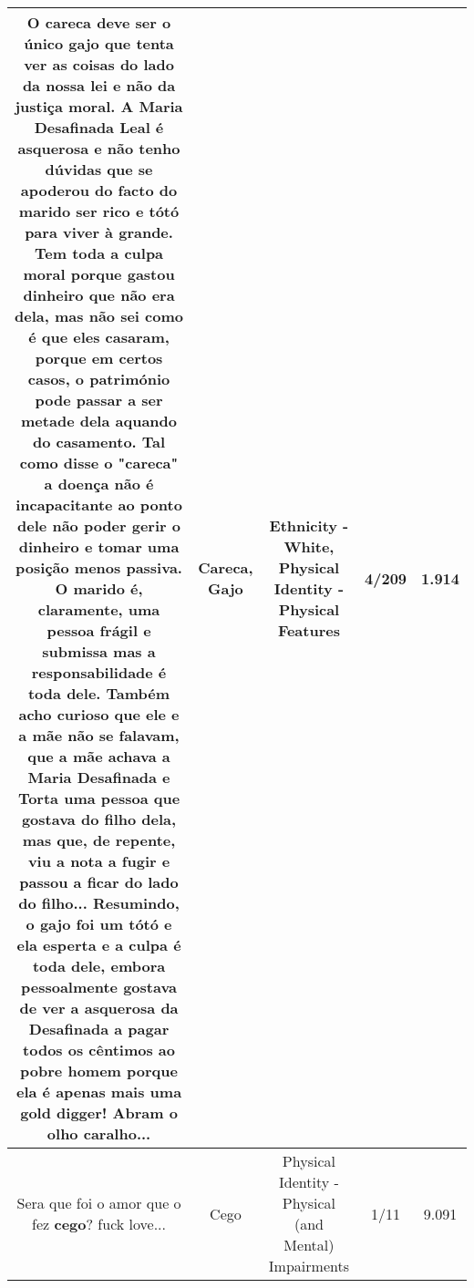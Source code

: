 \documentclass[11pt]{article}
\newlength\mylength
\begin{document}
\begin{center}
\begin{longtable}{|C{.65\mylength}|C{.30\mylength}|C{.12\mylength}|C{.12\mylength}|C{.12\mylength}|}
  \small O \textbf{careca} deve ser o único \textbf{gajo} que tenta ver as coisas do lado da nossa lei e não da justiça moral. A Maria Desafinada Leal é asquerosa e não tenho dúvidas que se apoderou do facto do marido ser rico e tótó para viver à grande. Tem toda a culpa moral porque gastou dinheiro que não era dela, mas não sei como é que eles casaram, porque em certos casos, o património pode passar a ser metade dela aquando do casamento. Tal como disse o "\textbf{careca}" a doença não é incapacitante ao ponto dele não poder gerir o dinheiro e tomar uma posição menos passiva. O marido é, claramente, uma pessoa frágil e submissa mas a responsabilidade é toda dele. Também acho curioso que ele e a mãe não se falavam, que a mãe achava a Maria Desafinada e Torta uma pessoa que gostava do filho dela, mas que, de repente, viu a nota a fugir e passou a ficar do lado do filho... Resumindo, o \textbf{gajo} foi um tótó e ela esperta e a culpa é toda dele, embora pessoalmente gostava de ver a asquerosa da Desafinada a pagar todos os cêntimos ao pobre homem porque ela é apenas mais uma gold digger! Abram o olho caralho...\normalsize   & Careca, Gajo & Ethnicity - White, Physical Identity - Physical Features & 4/209 & 1.914 \\  \hline
  \small Sera que foi o amor que o fez \textbf{cego}? fuck love...\normalsize   & Cego & Physical Identity - Physical (and Mental) Impairments & 1/11 & 9.091 \\  \hline
  
\end{longtable}
\end{center}
\end{document}
